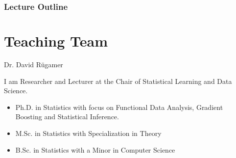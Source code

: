 
 









\begin{vbframe}
\frametitle{Lecture Outline}
\tableofcontents
\end{vbframe}


\section{Teaching Team}

\begin{frame}  {Dr. David R{\"u}gamer}

 I am Researcher and Lecturer at the Chair of Statistical Learning and Data Science.
    \begin{itemize}
      \item Ph.D. in Statistics with focus on Functional Data Analysis, Gradient Boosting and Statistical Inference. 
      \item M.Sc. in Statistics with Specialization in Theory
      \item B.Sc. in Statistics with a Minor in Computer Science
    \end{itemize}
    
  \begin{figure}

  \end{figure}
  
\end{frame}


